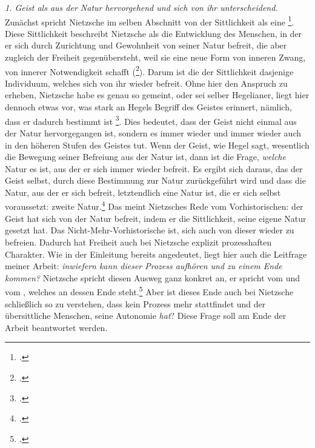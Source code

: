 \documentclass[12pt, a4paper, openany]{report}
\begin{document}
\emph{1. Geist als aus der Natur hervorgehend und sich von ihr unterscheidend.}\\
Zunächst spricht Nietzsche im selben Abschnitt von der Sittlichkeit als eine \footcite[][293]{nietzsche_jenseits_2014}.
Diese Sittlichkeit beschreibt Nietzsche als die Entwicklung des Menschen, in der er sich durch Zurichtung und Gewohnheit von seiner Natur befreit, die aber zugleich der Freiheit gegenübersteht, weil sie eine neue Form von inneren Zwang, von innerer Notwendigkeit schafft (\footcite[][292]{nietzsche_jenseits_2014}).
Darum ist die  der Sittlichkeit dasjenige Individuum, welches sich von ihr wieder befreit.
Ohne hier den Anspruch zu erheben, Nietzsche habe es genau so gemeint, oder sei selber Hegelianer, liegt hier dennoch etwas vor, was stark an Hegels Begriff des Geistes erinnert, nämlich, dass er dadurch bestimmt ist \footcite[][294]{khurana_freiheit_2017}.%
Dies bedeutet, dass der Geist nicht einmal aus der Natur hervorgegangen ist, sondern es immer wieder und immer wieder auch in den höheren Stufen des Geistes tut.
Wenn der Geist, wie Hegel sagt, wesentlich die Bewegung seiner Befreiung aus der Natur ist, dann ist die Frage, \emph{welche} Natur es ist, aus der er sich immer wieder befreit. 
Es ergibt sich daraus, das der Geist selbst, durch diese Bestimmung zur Natur zurückgeführt wird und dass die Natur, aus der er sich befreit, letztendlich eine Natur ist, die er sich selbst voraussetzt: zweite Natur.\footcite[Vgl.][320]{khurana_freiheit_2017}
Das meint Nietzsches Rede vom Vorhistorischen: 
der Geist hat sich von der Natur befreit, indem er die Sittlichkeit, seine eigene Natur gesetzt hat. 
Das Nicht-Mehr-Vorhistorische ist, sich auch von dieser wieder zu befreien.
Dadurch hat Freiheit auch bei Nietzsche explizit prozesshaften Charakter. 
Wie in der Einleitung bereits angedeutet, liegt hier auch die Leitfrage meiner Arbeit: \emph{inwiefern kann dieser Prozess aufhören und zu einem Ende kommen?}
Nietzsche spricht diesen Ausweg ganz konkret an, er spricht vom  und vom , welches an dessen Ende steht.\footcite[][293]{nietzsche_jenseits_2014} 
Aber ist dieses Ende auch bei Nietzsche schließlich so zu verstehen, dass kein Prozess mehr stattfindet und der übersittliche Menschen, seine Autonomie \emph{hat}?
Diese Frage soll am Ende der Arbeit beantwortet werden.\\
\end{document}
